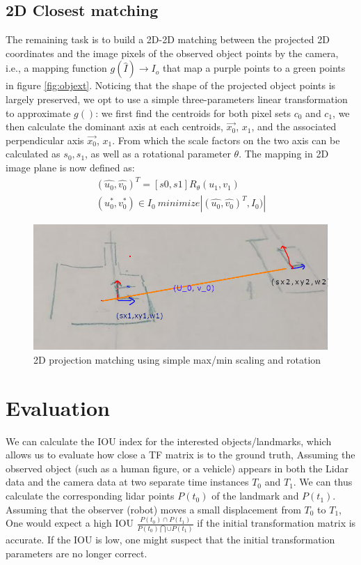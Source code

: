 \documentclass[journal]{IEEEtran}
\begin{document}
\subsection{2D Closest matching }
The remaining task is to build a 2D-2D matching between the projected 2D coordinates and the image pixels of the observed object points by the camera, i.e., a mapping function $g(\hat{I}) \rightarrow I_o$ that map a purple points to a green points in figure \ref{fig:objext}. Noticing that the shape of the projected object points is largely preserved,  
we opt to use a simple three-parameters linear transformation to approximate $g()$: we first find the centroids for both pixel sets $c_0$ and $c_1$, we then calculate the dominant axis at each centroids, $\overrightarrow{x_0}$, $x_1$, and the associated perpendicular axis $\overrightarrow{x_0}$, $x_1$. From which the scale factors on the two axis can be calculated as $s_0, s_1$, as well as a rotational parameter $\theta$. The mapping in 2D image plane is now defined as:
\begin{eqnarray}
(\hat{u_0}, \hat{v_0})^T = [s0, s1] R_{\theta} (u_1, v_1) \\
(u_0^*, v_0^*) \in I_0 ~ minimize |(\hat{u_0}, \hat{v_0})^T, I_0)|
\end{eqnarray}

\begin{figure}[]
    \centering
    \includegraphics[width=0.5\columnwidth]{images/2dpoints_match.png}
    \caption{2D projection matching using simple max/min scaling and rotation}
    \label{fig:gicp_result}
\end{figure} 
\section{Evaluation}
We can calculate the IOU index for the interested objects/landmarks, which allows us to evaluate how close a TF matrix is to the ground truth, Assuming the observed object (such as a human figure, or a vehicle) appears in both the Lidar data and the camera data at two separate time instances $T_0$ and $T_1$. We can thus calculate the corresponding lidar points $P(t_0)$ of the landmark and  $P(t_1)$. Assuming that the observer (robot) moves a small displacement from $T_0$ to $T_1$, One would expect a high IOU $\frac{P(t_0) \cap P(t_1)}{P(t_0) \bigcap \cup P(t_1)}$ if the initial transformation matrix is accurate. If the IOU is low, one might suspect that the initial transformation parameters are no longer correct.
\end{document}
